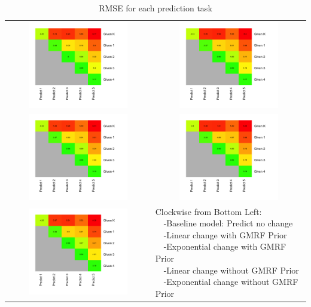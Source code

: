 \documentclass[journal]{IEEEtran}
\begin{document}
\begin{table}
\begin{tabular}[t]{ m{4cm} m{1cm} }
\centering
\includegraphics[width=3in,height=1.5in,clip,keepaspectratio]{exp_corr_error.png}
&
\includegraphics[width=3in,height=1.5in,clip,keepaspectratio]{exp_no_corr_error.png}
\\
\includegraphics[width=3in,height=1.5in,clip,keepaspectratio]{lin_corr_error.png}
&
\includegraphics[width=3in,height=1.5in,clip,keepaspectratio]{lin_no_corr_error.png}
\\
\includegraphics[width=3in,height=1.5in,clip,keepaspectratio]{no_change_error.png}
& \pbox{3.6cm}{\scriptsize Clockwise from Bottom Left:\\~~-Baseline model: Predict no change\\~~-Linear change with GMRF Prior\\~~-Exponential change with GMRF Prior\\~~-Linear change without GMRF Prior\\~~-Exponential change without GMRF Prior} \\
\end{tabular}
\caption{RMSE for each prediction task}
\label{tab:rmse_for_mm}
\end{table}
\end{document}
